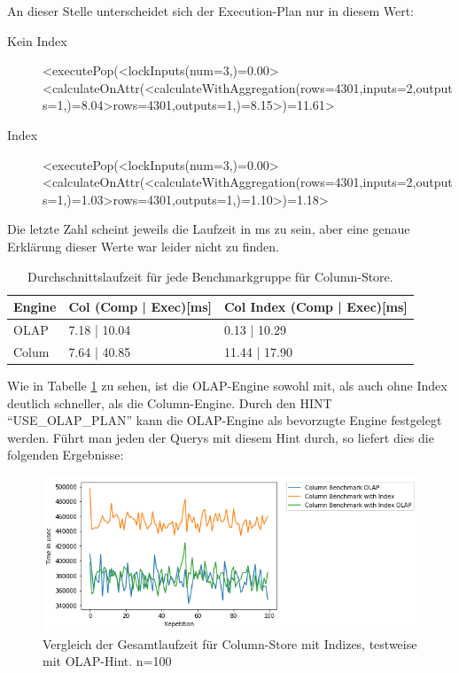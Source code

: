 An dieser Stelle unterscheidet sich der Execution-Plan nur in diesem Wert:
\begin{description}
    \item[Kein Index] <executePop(<lockInputs(num=3,)=0.00><calculateOnAttr(<calculateWithAggregation(rows=4301,inputs=2,outputs=1,)=8.04>rows=4301,outputs=1,)=8.15>)=11.61>
    \item[Index]      <executePop(<lockInputs(num=3,)=0.00><calculateOnAttr(<calculateWithAggregation(rows=4301,inputs=2,outputs=1,)=1.03>rows=4301,outputs=1,)=1.10>)=1.18>
\end{description}

Die letzte Zahl scheint jeweils die Laufzeit in ms zu sein, aber eine genaue Erklärung dieser Werte war leider nicht zu finden.

\begin{table}[H]
    \centering
    \begin{tabularx}{14cm}{lXX}
        \toprule
        Engine              & Col (Comp | Exec)[ms]                 & Col Index (Comp | Exec)[ms]     \\
        \toprule
        OLAP                & 7.18 | 10.04          & 0.13  | 10.29         \\
        Colum               & 7.64 | 40.85          & 11.44 | 17.90          \\   
        \bottomrule
    \end{tabularx}
	\caption{Durchschnittslaufzeit für jede Benchmarkgruppe für Column-Store.}
    \label{tab:olap}
\end{table}

Wie in Tabelle \ref{tab:olap} zu sehen, ist die OLAP-Engine sowohl mit, als auch ohne Index deutlich schneller, als die Column-Engine. Durch den HINT \enquote{USE\_OLAP\_PLAN} kann die OLAP-Engine als bevorzugte Engine festgelegt werden. Führt man jeden der Querys mit diesem Hint durch, so liefert dies die folgenden Ergebnisse:

\begin{figure}
    \centering
    \includegraphics[scale=0.7]{images/olap_column_overall.png}
    \caption{Vergleich der Gesamtlaufzeit für Column-Store mit Indizes, testweise mit OLAP-Hint. n=100}
	\label{fig:olap_column_overall}
\end{figure}

